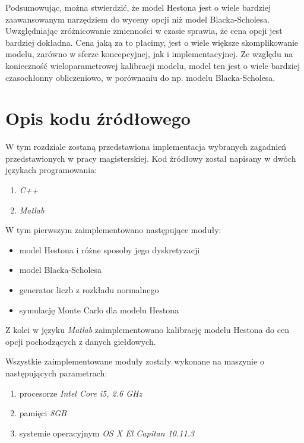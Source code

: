 \documentclass{pracamgr}
\begin{document}
Podsumowując, można stwierdzić, że model Hestona jest o wiele bardziej zaawansowanym
narzędziem do wyceny opcji niż model Blacka-Scholesa. Uwzględniając zróżnicowanie zmienności 
w czasie sprawia, że cena opcji jest bardziej dokładna. Cena jaką za to płacimy,
jest o wiele większe skomplikowanie modelu, zarówno w sferze koncepcyjnej, jak i 
implementacyjnej. Ze względu na konieczność wieloparametrowej kalibracji modelu, 
model ten jest o wiele bardziej czasochłonny obliczeniowo, w porównaniu do np. modelu Blacka-Scholesa.

\cleardoublepage
{}
\appendix

\chapter{Opis kodu źródłowego}

W tym rozdziale zostaną przedstawiona implementacja wybranych zagadnień przedstawionych w 
pracy magisterskiej. Kod źródłowy został napisany w dwóch językach programowania: 
\begin{enumerate}
  \item \textit{C++}
  \item \textit{Matlab}
\end{enumerate}
W tym pierwszym zaimplementowano następujące moduły:
\begin{itemize}
  \item model Hestona i różne sposoby jego dyskretyzacji
  \item model Blacka-Scholesa
  \item generator liczb z rozkładu normalnego
  \item symulację Monte Carlo dla modelu Hestona
\end{itemize}
Z kolei w języku \textit{Matlab} zaimplementowano kalibrację modelu Hestona do cen opcji pochodzących
z danych giełdowych.

Wszystkie zaimplementowane moduły zostały wykonane na maszynie o następujących parametrach:
\begin{enumerate}
  \item procesorze \textit{Intel Core i5, 2.6 GHz}
  \item pamięci \textit{8GB}
  \item systemie operacyjnym \textit{OS X El Capitan 10.11.3}
\end{enumerate}
\end{document}
